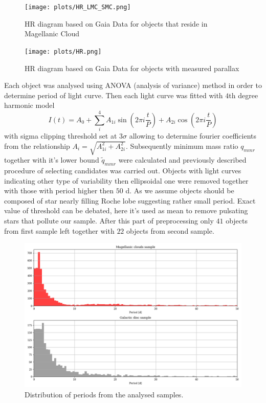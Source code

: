 \documentclass{pracalicmgr}
\begin{document}
\begin{figure}[H]
    \begin{center}
        \texttt{[image: plots/HR\_LMC\_SMC.png]}
    \end{center}
    \caption{HR diagram based on Gaia Data for objects that reside in Magellanic Cloud}
\end{figure}

\begin{figure}[H]
    \begin{center}
        \texttt{[image: plots/HR.png]}
    \end{center}
    \caption{HR diagram based on Gaia Data for objects with measured parallax}
\end{figure}

Each object was analysed using ANOVA (analysis of variance) method \citep{schwarzenberg-czerny_advantage_1989} in order to determine period of light curve.
Then each light curve was fitted with $4$th degree harmonic model
\begin{equation}\label{harm}
    I(t)=A_0+\sum_i^4 A_{1i}\sin{\left(2\pi i\frac{t}{P}\right)}+A_{2i}\cos{\left(2\pi i\frac{t}{P}\right)}
\end{equation}
with sigma clipping threshold set at $3\sigma$ allowing to determine fourier coefficients from the relationship $A_i=\sqrt{A_{1i}^2+A_{2i}^2}$.
 Subsequently minimum mass ratio $q_{mmr}$ together with it's lower bound $\tilde{q}_{mmr}$ were calculated and previously described procedure of selecting candidates was carried out.
Objects with light curves indicating other type of variability then ellipsoidal one were removed together with those with period higher then
$50$ d. As we assume objects should be composed of star nearly filling Roche lobe suggesting rather small period. Exact value of threshold can be debated, here it's used as mean to 
remove pulsating stars that pollute our sample. After this part of preprocessing only $41$ objects from first sample left together with $22$ objects from second sample.
\begin{figure}
    \includegraphics[scale=0.5]{plots/periods.png}
    \caption{Distribution of periods from the analysed samples.}
\end{figure}
\end{document}
